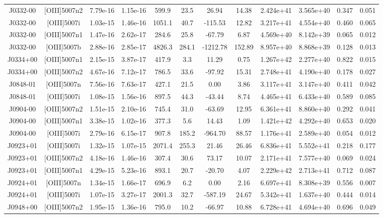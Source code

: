 \begin{table}
\begin{tabular}{cccccccccccc}
J0332-00 & [OIII]5007n2 & 7.79e-16 & 1.15e-16 & 599.9 & 23.5 & 26.94 & 14.38 & 2.424e+41 & 3.565e+40 & 0.347 & 0.051 \\
J0332-00 & [OIII]5007i & 1.03e-15 & 1.46e-16 & 1051.1 & 40.7 & -115.53 & 12.82 & 3.217e+41 & 4.554e+40 & 0.460 & 0.065 \\
J0332-00 & [OIII]5007n1 & 1.47e-16 & 2.62e-17 & 284.6 & 25.8 & -67.79 & 6.87 & 4.569e+40 & 8.142e+39 & 0.065 & 0.012 \\
J0332-00 & [OIII]5007b & 2.88e-16 & 2.85e-17 & 4826.3 & 284.1 & -1212.78 & 152.89 & 8.957e+40 & 8.868e+39 & 0.128 & 0.013 \\
J0334+00 & [OIII]5007n1 & 2.15e-15 & 3.87e-17 & 417.9 & 3.3 & 11.29 & 0.75 & 1.267e+42 & 2.277e+40 & 0.822 & 0.015 \\
J0334+00 & [OIII]5007n2 & 4.67e-16 & 7.12e-17 & 786.5 & 33.6 & -97.92 & 15.31 & 2.748e+41 & 4.190e+40 & 0.178 & 0.027 \\
J0848-01 & [OIII]5007n & 7.56e-16 & 7.63e-17 & 427.1 & 21.5 & 0.00 & 3.86 & 3.117e+41 & 3.147e+40 & 0.411 & 0.042 \\
J0848-01 & [OIII]5007i & 1.08e-15 & 1.56e-16 & 897.5 & 44.3 & -43.44 & 8.74 & 4.465e+41 & 6.433e+40 & 0.589 & 0.085 \\
J0904-00 & [OIII]5007n2 & 1.51e-15 & 2.10e-16 & 745.4 & 31.0 & -63.69 & 12.95 & 6.361e+41 & 8.860e+40 & 0.292 & 0.041 \\
J0904-00 & [OIII]5007n1 & 3.38e-15 & 1.02e-16 & 377.3 & 5.6 & 14.43 & 1.09 & 1.421e+42 & 4.292e+40 & 0.653 & 0.020 \\
J0904-00 & [OIII]5007i & 2.79e-16 & 6.15e-17 & 907.8 & 185.2 & -964.70 & 88.57 & 1.176e+41 & 2.589e+40 & 0.054 & 0.012 \\
J0923+01 & [OIII]5007i & 1.32e-15 & 1.07e-15 & 2071.4 & 255.3 & 21.46 & 26.46 & 6.836e+41 & 5.552e+41 & 0.218 & 0.177 \\
J0923+01 & [OIII]5007n2 & 4.18e-16 & 1.46e-16 & 307.4 & 30.6 & 73.17 & 10.07 & 2.171e+41 & 7.577e+40 & 0.069 & 0.024 \\
J0923+01 & [OIII]5007n1 & 4.29e-15 & 5.23e-16 & 893.1 & 20.7 & -20.70 & 4.07 & 2.229e+42 & 2.713e+41 & 0.712 & 0.087 \\
J0924+01 & [OIII]5007n & 1.34e-15 & 1.66e-17 & 696.9 & 6.2 & 0.00 & 2.16 & 6.697e+41 & 8.308e+39 & 0.556 & 0.007 \\
J0924+01 & [OIII]5007i & 1.07e-15 & 3.27e-17 & 2001.3 & 32.7 & -587.19 & 24.67 & 5.342e+41 & 1.637e+40 & 0.444 & 0.014 \\
J0948+00 & [OIII]5007n2 & 1.95e-15 & 1.36e-16 & 795.0 & 10.2 & -66.97 & 10.88 & 6.728e+41 & 4.694e+40 & 0.696 & 0.049 \\

\end{tabular}
\end{table}
